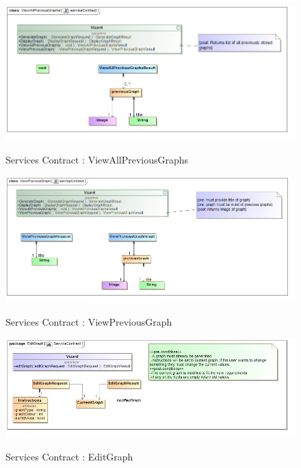 \documentclass[a4paper,12pt]{article}
\begin{document}
	\begin{figure}[H]
		\includegraphics[width=\textwidth]{Images/class__ViewAllPreviousGraphs__serviceContract.png}  \\
		\caption{Services Contract : ViewAllPreviousGraphs}
	\end{figure}
	
	\begin{figure}[H]
		\includegraphics[width=\textwidth]{Images/class__ViewPreviousGraph__serviceContract.png}  \\
		\caption{Services Contract : ViewPreviousGraph}
	\end{figure}
	
	\begin{figure}[H]
		\includegraphics[width=\textwidth]{Images/class__EditGraph}  \\
		\caption{Services Contract : EditGraph}
	\end{figure}
	
\end{document}

